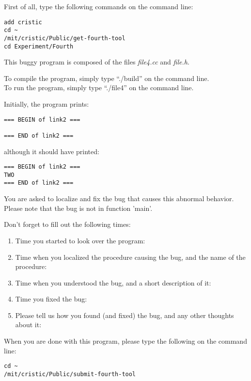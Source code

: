 \documentclass{article}
\title{}
\author{Bug 4 - Tool}
\date{July 30, 2003}
\begin{document}
\maketitle
\begin{flushleft}
\vspace{0.5in}

\thispagestyle{empty}

First of all, type the following commands on the command line:
\begin{verbatim}
add cristic
cd ~
/mit/cristic/Public/get-fourth-tool
cd Experiment/Fourth
\end{verbatim}


\vspace{0.1in}
This buggy program is composed of the files {\it file4.cc} and 
{\it file.h}. 

\vspace{0.1in}
To compile the program, simply type ``./build'' on the command line.\\
To run the program, simply type ``./file4'' on the command line.


\vspace{0.1in}
Initially, the program prints:

\begin{verbatim}
=== BEGIN of link2 ===

=== END of link2 ===
\end{verbatim}

although it should have printed:
\begin{verbatim}
=== BEGIN of link2 ===
TWO
=== END of link2 ===
\end{verbatim}

You are asked to localize and fix the bug that causes this abnormal behavior.
Please note that the bug is not in function 'main'.


\vspace{0.3in}
Don't forget to fill out the following times:
\begin{enumerate}
\item{Time you started to look over the program:}
\item{Time when you localized the procedure causing the bug, and the name
      of the procedure:\vspace{0.2in}}
\item{Time when you understood the bug, and a short description of it:\vspace{0.4in}}

\item{Time you fixed the bug:}

\item{Please tell us how you found (and fixed) the bug, and any other thoughts 
about it:}

\end{enumerate}

\vspace{0.45in}
When you are done with this program, please type the following on the 
command line:
\begin{verbatim}
cd ~
/mit/cristic/Public/submit-fourth-tool
\end{verbatim}


\end{flushleft}
\end{document}
